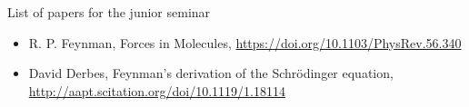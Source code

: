 \documentclass[A4paper, 12pt]{article}
\begin{document}
\begin{center}
  {\huge List of papers for the junior seminar}
\end{center}

\begin{itemize}
  \item
    R. P. Feynman, Forces in Molecules,
    \url{https://doi.org/10.1103/PhysRev.56.340}
  \item
    David Derbes, Feynman’s derivation of the Schrödinger equation,
    \url{http://aapt.scitation.org/doi/10.1119/1.18114}

\end{itemize}
\end{document}
